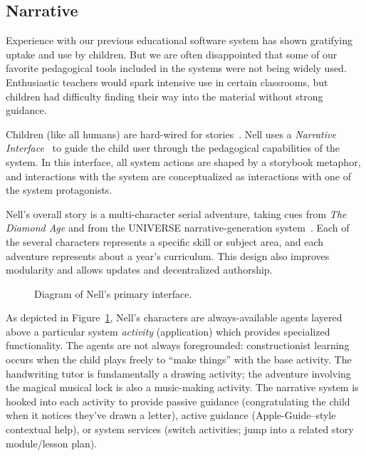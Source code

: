 \documentclass[preprint]{sig-alternate}
\begin{document}

\subsection{Narrative}

Experience with our previous educational software
system has shown gratifying uptake and
use by children.  But we are often disappointed that some of our
favorite pedagogical tools included in the systems were not being
widely used.  Enthusiastic teachers would spark intensive use in
certain classrooms, but children had difficulty finding their way into
the material without strong guidance.

Children (like all humans) are hard-wired for
stories~\cite{boyd:stories}.  Nell uses a
\textit{Narrative Interface}~\cite{bizzocchi:narrative,don:narrative}
to guide the child user through the pedagogical capabilities of the
system. 
In this interface, all system actions are shaped by a storybook metaphor, and
interactions with the system are conceptualized as interactions with one of the
system protagonists.

Nell's overall story is a multi-character serial adventure, taking
cues from \textit{The Diamond Age} and
from the UNIVERSE narrative-generation system~\cite{lebowitz:universe85}.
Each of the several characters represents a specific skill or subject
area, and each adventure represents about a year's curriculum.  This
design also improves modularity and allows updates and decentralized
authorship.

\begin{figure}
\centering
{} %
\caption{Diagram of Nell's primary interface.}\label{fig:nell}
\end{figure}

As depicted in Figure~\ref{fig:nell}, Nell's characters are
always-available agents layered above a particular system \textit{activity}
(application) which provides specialized functionality.  The agents
are not always foregrounded: constructionist learning occurs when the
child plays freely to ``make things'' with the base activity.
The handwriting tutor is fundamentally a drawing activity; the
adventure involving the magical musical lock is also a music-making activity.
The narrative system is
hooked into each activity to provide passive guidance
(congratulating the child when it notices they've drawn a letter),
active guidance (Apple-Guide--style~\cite{powers:appleguide}
contextual help), or system services (switch activities; jump into a
related story module/lesson plan).
\end{document}
